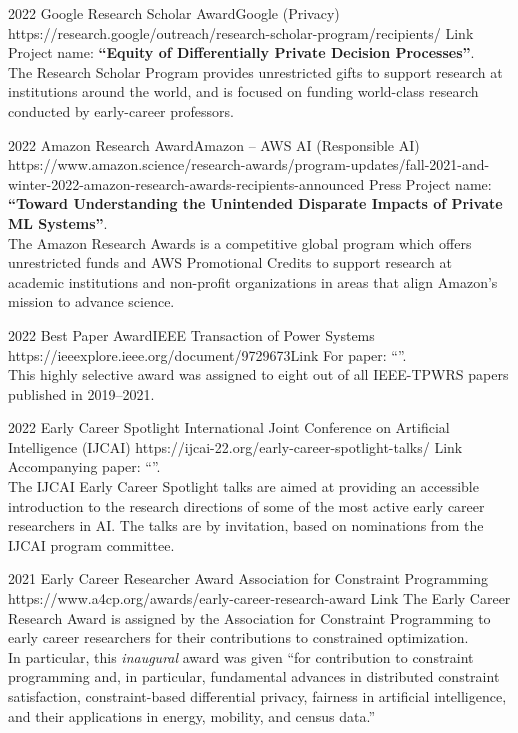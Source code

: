 \begin{awards}
	\awardentryD
	{2022}
	{Google Research Scholar Award}{Google (Privacy)}
	{https://research.google/outreach/research-scholar-program/recipients/}
	{Link}
	{
	Project name: \textbf{``Equity of Differentially Private Decision Processes''}.\\
	The Research Scholar Program provides unrestricted gifts to support research at institutions around the world, and is focused on funding world-class research conducted by early-career professors.
	}

	\awardentryD
	{2022}
	{Amazon Research Award}{Amazon -- AWS AI (Responsible AI)}
	{https://www.amazon.science/research-awards/program-updates/fall-2021-and-winter-2022-amazon-research-awards-recipients-announced}%
	{Press}
	{
	Project name: \textbf{``Toward Understanding the Unintended Disparate Impacts of Private ML Systems''}.\\
	The Amazon Research Awards is a competitive global program which offers unrestricted funds and AWS Promotional Credits to support research at academic institutions and non-profit organizations in areas that align Amazon's mission to advance science.}

	\awardentryD
	{2022}
	{Best Paper Award}{IEEE Transaction of Power Systems}
	{https://ieeexplore.ieee.org/document/9729673}{Link}
	{
	For paper: ``''.\\
	This highly selective award was assigned to eight out of all IEEE-TPWRS papers published in 2019--2021.}

	\awardentryD
	{2022}
	{Early Career Spotlight}%
	{International Joint Conference on Artificial Intelligence (IJCAI)}
	{https://ijcai-22.org/early-career-spotlight-talks/}
	{Link}
	{Accompanying paper: ``''.\\
	The IJCAI Early Career Spotlight talks are aimed at providing an accessible introduction to the research directions of some of the most active early career researchers in AI.
	The talks are by invitation, based on nominations from the IJCAI program committee.
	}

	\awardentryD
	{2021}
	{Early Career Researcher Award}
	{Association for Constraint Programming}
	{https://www.a4cp.org/awards/early-career-research-award}
	{Link}
	{The Early Career Research Award is assigned by the Association for Constraint Programming to early career researchers for their 
	contributions to constrained optimization.\\
	In particular, this \emph{inaugural} award was given 
	``for contribution to constraint programming and, in particular,
	fundamental advances in distributed constraint satisfaction, constraint-based
	differential privacy, fairness in artificial intelligence, and their 
	applications in energy, mobility, and census data.''}


\end{awards}
